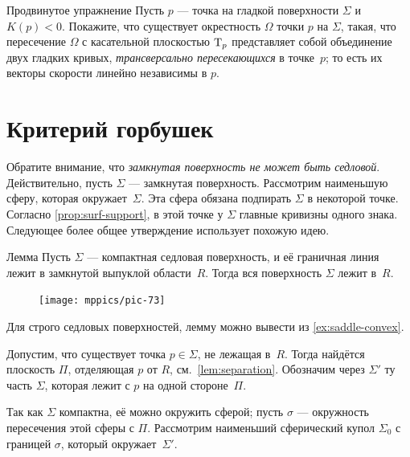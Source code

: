 \begin{thm}{Продвинутое упражнение}\label{ex:crosss}
Пусть $p$ --- точка на гладкой поверхности $\Sigma$ и $K(p)<0$.
Покажите, что существует окрестность $\Omega$ точки $p$ на $\Sigma$,
такая, что пересечение $\Omega$ с касательной плоскостью $\mathrm{T}_p$ представляет собой объединение двух гладких кривых, \emph{трансверсально пересекающихся} в точке~$p$;
то есть их векторы скорости линейно независимы в $p$.
\end{thm}



\section{Критерий горбушек}

Обратите внимание, что \textit{замкнутая поверхность не может быть седловой}.
Действительно, пусть $\Sigma$ --- замкнутая поверхность.
Рассмотрим наименьшую сферу, которая окружает~$\Sigma$.
Эта сфера обязана подпирать $\Sigma$ в некоторой точке.
Согласно \ref{prop:surf-support}, в этой точке у $\Sigma$ главные кривизны одного знака.
Следующее более общее утверждение использует похожую идею.

\begin{thm}{Лемма}\label{lem:convex-saddle}
Пусть $\Sigma$ --- компактная седловая поверхность, и её граничная линия лежит в замкнутой выпуклой области~$R$.
Тогда вся поверхность $\Sigma$ лежит в~$R$.
\end{thm}

{

\begin{figure}
\vskip-8mm
\centering
\texttt{[image: mppics/pic-73]}
\vskip-4mm
\end{figure}

Для строго седловых поверхностей, лемму можно вывести из \ref{ex:saddle-convex}.

Допустим, что существует точка $p\in \Sigma$,  не лежащая в~$R$.
Тогда найдётся плоскость $\Pi$, отделяющая $p$ от $R$, см.~\ref{lem:separation}.
Обозначим через $\Sigma'$ ту часть $\Sigma$, которая лежит с $p$ на одной стороне~$\Pi$.

}

Так как $\Sigma$ компактна, её можно окружить сферой;
пусть $\sigma$ --- окружность пересечения этой сферы с $\Pi$.
Рассмотрим наименьший сферический купол $\Sigma_0$ с границей $\sigma$, который окружает~$\Sigma'$.


